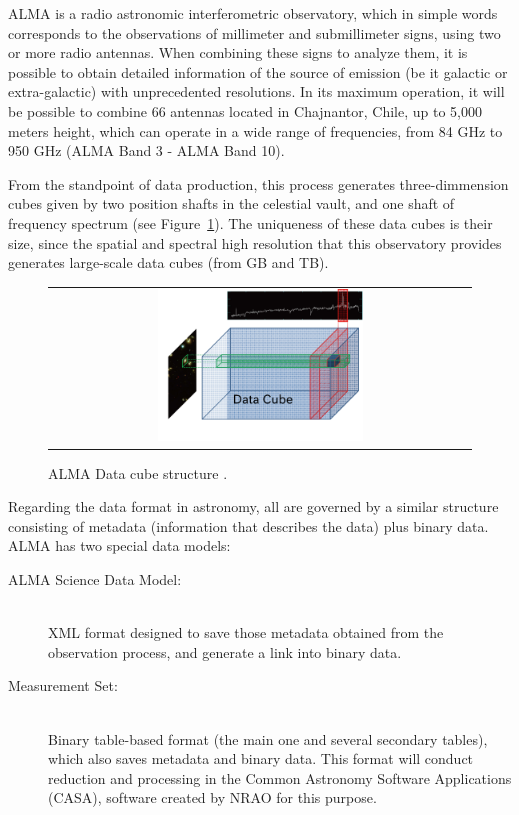 \documentclass[]{spie}
\begin{document}
ALMA is a radio astronomic interferometric observatory, which in simple words
corresponds to the observations of millimeter and submillimeter signs, using
two or more radio antennas.  When combining these signs to analyze them, it is
possible to obtain detailed information of the source of emission (be it
galactic or extra-galactic) with unprecedented resolutions.  In its maximum
operation, it will be possible to combine 66 antennas located in Chajnantor,
Chile, up to 5,000 meters height, which can operate in a wide range of
frequencies, from 84 GHz to 950 GHz (ALMA Band 3 - ALMA Band 10).

From the standpoint of data production, this process generates three-dimmension
cubes given by two position shafts in the celestial vault, and one shaft of
frequency spectrum (see Figure~\ref{fig:cube}).  The uniqueness of these data cubes is their
size, since the spatial and spectral high resolution that this observatory
provides generates large-scale data cubes (from GB and TB).

\begin{figure}
   \begin{center}
   \begin{tabular}{c}
   \includegraphics[width=0.5\textwidth]{images/cube.png}
   \end{tabular}
   \end{center}
   \caption[example]
   { \label{fig:cube} ALMA Data cube structure \cite{dent20132}.}
\end{figure}


Regarding the data format in astronomy, all are governed by a similar structure
consisting of metadata (information that describes the data) plus binary data.
ALMA has two special data models:
\begin{description}
    \item[ALMA Science Data Model:] \hfill \\
        XML format designed to save those metadata obtained from the observation
        process, and generate a link into binary data.
    \item[Measurement Set:] \hfill \\
        Binary table-based format (the main one and several secondary tables),
        which also saves metadata and binary data. This format will conduct
        reduction and processing in the Common Astronomy Software Applications
        (CASA), software created by NRAO  for this purpose.
\end{description}
\end{document}
